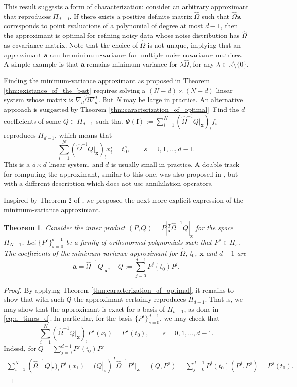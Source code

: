 \documentclass[preprint]{elsarticle}       %
\newcommand{\R}{\mathds{R}}
\newcommand{\ba}{\bm{a}}
\newcommand{\bff}{\bm{f}}
\newcommand{\bx}{\bm{x}}
\newcommand{\dif}{\nabla_d}
\theoremstyle{plain}
\newtheorem{thm}{Theorem}
\theoremstyle{remark}
\begin{document}
This result suggests a form of characterization: consider an arbitrary approximant that reproduces $\Pi_{d-1}$. If there exists a positive definite matrix $\hat \Omega$ such that $\hat \Omega \ba$ corresponds to point evaluations of a polynomial of degree at most $d-1$, then the approximant is optimal for refining noisy data whose noise distribution has $\hat \Omega$ as covariance matrix. Note that the choice of $\hat \Omega$ is not unique, implying that an approximant $\ba$ can be minimum-variance for multiple noise covariance matrices. A simple example is that $\ba$ remains minimum-variance for $\lambda \hat \Omega$, for any $\lambda\in\R\setminus\{0\}$.

Finding the minimum-variance approximant as proposed in Theorem \ref{thm:existance_of_the_best} requires solving a $(N-d)\times (N-d)$ linear system whose matrix is $\dif \hat \Omega \dif^T$. But $N$ may be large in practice. An alternative approach is suggested by Theorem \ref{thm:caracterization_of_optimal}: Find the $d$ coefficients of some $Q\in\Pi_{d-1}$ such that $\Psi(\bff):= \sum_{i=1}^{N} (\hat \Omega^{-1} Q|_{\bx})_i f_i$ reproduces $\Pi_{d-1}$, which means that
\begin{equation} \label{eq:d_times_d}
    \sum_{i=1}^{N} (\hat \Omega^{-1} Q|_{\bx})_i x_i^s = t_0^s, \qquad s = 0,1,\ldots,d-1.
\end{equation}
This is a $d\times d$ linear system, and $d$ is usually small in practice.
A double track for computing the approximant, similar to this one, was also proposed in \cite{CR76}, but with a different description which does not use annihilation operators.

Inspired by Theorem 2 of \cite{CR76}, we proposed the next more explicit expression of the minimum-variance approximant.
\begin{thm}\label{thm:orthonormal}
    Consider the inner product $(P,Q) = P|_{\bx}^T \hat\Omega^{-1} Q|_{\bx}$ for the space $\Pi_{N-1}$.
    Let $\{P^s\}_{s=0}^{d-1}$ be a family of orthonormal polynomials such that $P^s\in\Pi_s$. The coefficients of the minimum-variance approximant for $\hat\Omega$, $t_0$, $\bx$ and $d-1$ are
    \[
        \ba = \hat\Omega^{-1} Q|_{\bx}, \quad Q:=\sum_{j=0}^{d-1} P^j(t_0) P^j.
    \]
\end{thm}
\begin{proof}
    By applying Theorem \ref{thm:caracterization_of_optimal}, it remains to show that with such $Q$ the approximant certainly reproduces $\Pi_{d-1}$. That is, we may show that the approximant is exact for a basis of $\Pi_{d-1}$, as done in \eqref{eq:d_times_d}. In particular, for the basis $\{P^s\}_{s=0}^{d-1}$, we may check that
    \[
    \sum_{i=1}^{N} (\hat \Omega^{-1} Q|_{\bx})_i P^s(x_i) = P^s(t_0), \qquad s = 0,1,\ldots,d-1.
    \]
    Indeed, for $Q=\sum_{j=0}^{d-1} P^j(t_0) P^j$,
    \begin{align*}
        \sum_{i=1}^{N} (\hat \Omega^{-1} Q|_{\bx})_i P^s(x_i)
        = (Q|_{\bx})^T \hat \Omega^{-1} P^s|_{\bx}
        = \left(Q,P^s\right)
        = \sum_{j=0}^{d-1} P^j(t_0) \left(P^j,P^s\right)
        = P^s(t_0).
    \end{align*}
\end{proof}
\end{document}
